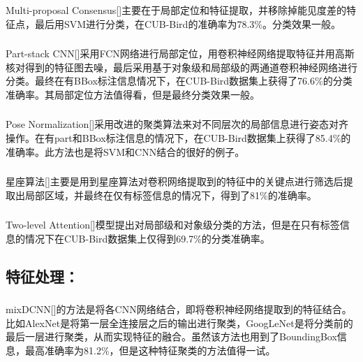 \documentclass[UTF8]{article}
\begin{document}
\subsubsection{{\color{BLUE}{Multi-proposal Consensus}}}
Multi-proposal Consensus\cite{mpc}[{\color{GREY}{弱监督 }}]主要在于局部定位和特征提取，并移除掉能见度差的特征点，最后用SVM进行分类，在CUB-Bird的准确率为78.3\%。分类效果一般。
\subsubsection{{\color{red}{Part-stack CNN}}}
Part-stack CNN\cite{partstackCNN}[{\color{GREY}{强监督 }}]采用FCN网络进行局部定位，用卷积神经网络提取特征并用高斯核对得到的特征图去噪，最后采用基于对象级和局部级的两通道卷积神经网络进行分类。最终在有BBox标注信息情况下，在CUB-Bird数据集上获得了76.6\%的分类准确率。其局部定位方法值得看，但是最终分类效果一般。
\subsubsection{{\color{BLUE}{Pose Normalization}}}
Pose Normalization\cite{posenorm}[{\color{GREY}{强监督 }}]采用改进的聚类算法来对不同层次的局部信息进行姿态对齐操作。在有part和BBox标注信息的情况下，在CUB-Bird数据集上获得了85.4\%的准确率。此方法也是将SVM和CNN结合的很好的例子。
\subsubsection{{\color{GREEN}{Constellations}}}
星座算法\cite{xingzuo}[{\color{GREY}{弱监督 }}]主要是用到星座算法对卷积网络提取到的特征中的关键点进行筛选后提取出局部区域，并最终在仅有标签信息的情况下，得到了81\%的准确率。
\subsubsection{{\color{red}{Two-level Attention}}}
Two-level Attention\cite{twolevel}[{\color{GREY}{弱监督 }}]模型提出对局部级和对象级分类的方法，但是在只有标签信息的情况下在CUB-Bird数据集上仅得到69.7\%的分类准确率。
\subsection{特征处理：}
\subsubsection{{\color{BLUE}{mixDCNN}}}
mixDCNN\cite{mixDCNN}[{\color{GREY}{强监督 }}]的方法是将各CNN网络结合，即将卷积神经网络提取到的特征结合。比如AlexNet是将第一层全连接层之后的输出进行聚类，GoogLeNet是将分类前的最后一层进行聚类，从而实现特征的融合。虽然该方法也用到了BoundingBox信息，最高准确率为81.2\%，但是这种特征聚类的方法值得一试。
\end{document}
